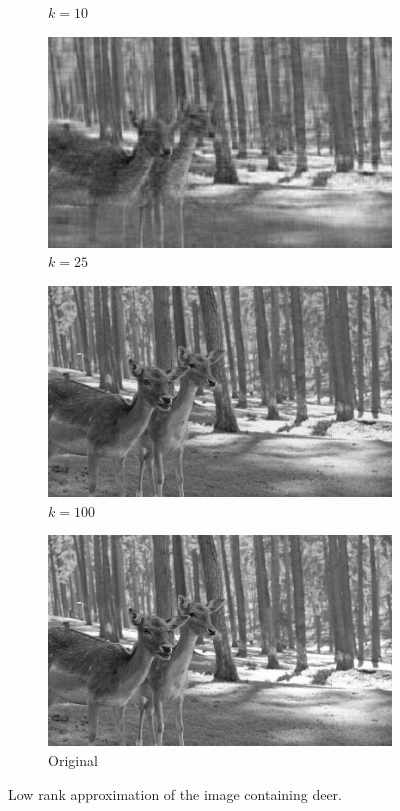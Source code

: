 \documentclass[11pt,a4paper]{article}
\begin{document}
\begin{figure}[H]
\begin{subfigure}[t]{.5\textwidth}
    \caption{$k = 10$}
  \end{subfigure}%
  \begin{subfigure}[t]{.5\textwidth}
    \centering
    \includegraphics[scale=0.2]{img/k25_deer}
    \caption{$k = 25$}
  \end{subfigure}
  \begin{subfigure}[t]{.5\textwidth}
    \centering
    \includegraphics[scale=0.2]{img/k100_deer}
    \caption{$k = 100$}
  \end{subfigure}%
  \begin{subfigure}[t]{.5\textwidth}
    \centering
    \includegraphics[scale=0.2]{img/deer}
    \caption{Original}
  \end{subfigure}%
  \caption{Low rank approximation of the image containing deer.}
  \label{fig:deer-lr-approximation}
\end{figure}
\end{document}
